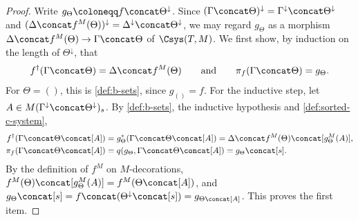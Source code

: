 \begin{proof}
    Write $g_\Theta \coloneqq f \concat \Theta^{\downarrow}$. Since $(\Gamma \concat \Theta)^{\downarrow} = \Gamma^{\downarrow} \concat \Theta^{\downarrow}$ and $(\Delta \concat f^M(\Theta))^{\downarrow} = \Delta^{\downarrow} \concat \Theta^{\downarrow}$, we may regard $g_\Theta$ as a morphism $\Delta \concat f^M(\Theta) \to \Gamma \concat \Theta$ of $\Csys(T, M)$. We first show, by induction on the length of $\Theta^{\downarrow}$, that
    \[
        f^\dagger(\Gamma \concat \Theta) = \Delta \concat f^M(\Theta) \qquad \text{and} \qquad \pi_f(\Gamma \concat \Theta) = g_\Theta.
    \]
    For $\Theta = ()$, this is \cref{def:b-sets}, since $g_{()} = f$. For the inductive step, let $A \in M(\Gamma^{\downarrow} \concat \Theta^{\downarrow})_s$. By \cref{def:b-sets}, the inductive hypothesis and \cref{def:sorted-c-system},
    \begin{align*}
        f^\dagger(\Gamma \concat \Theta \concat [A]) &= g_\Theta^*(\Gamma \concat \Theta \concat [A]) = \Delta \concat f^M(\Theta) \concat [g_\Theta^M(A)],\\
        \pi_f(\Gamma \concat \Theta \concat [A]) &= q(g_\Theta, \Gamma \concat \Theta \concat [A]) = g_\Theta \concat [s].
    \end{align*}
    By the definition of $f^M$ on $M$-decorations, $f^M(\Theta) \concat [g_\Theta^M(A)] = f^M(\Theta \concat [A])$, and $g_\Theta \concat [s] = f \concat (\Theta^{\downarrow} \concat [s]) = g_{\Theta \concat [A]}$. This proves the first item.


\end{proof}
